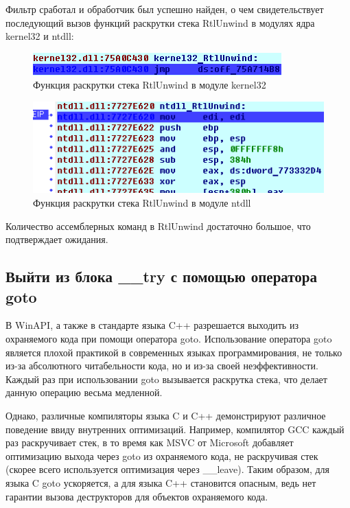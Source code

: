 \documentclass[14pt,a4paper,report]{report}
\begin{document}
Фильтр сработал и обработчик был успешно найден, о чем свидетельствует последующий вызов функций раскрутки стека RtlUnwind в модулях ядра kernel32 и ntdll:

\begin{figure}[h!]
	\centering
	\includegraphics[scale = 0.75]{images/6_d6.png}
	\caption{Функция раскрутки стека RtlUnwind в модуле kernel32}
\end{figure}

\begin{figure}[h!]
	\centering
	\includegraphics[scale = 0.75]{images/6_d7.png}
	\caption{Функция раскрутки стека RtlUnwind в модуле ntdll}
\end{figure}

Количество ассемблерных команд в RtlUnwind достаточно большое, что подтверждает ожидания. 

\subsection{Выйти из блока \_\_try с помощью оператора goto}

В WinAPI, а также в стандарте языка C++ разрешается выходить из охраняемого кода при помощи оператора goto. Использование оператора goto является плохой практикой в современных языках программирования, не только из-за абсолютного читабельности кода, но и из-за своей неэффективности. Каждый раз при использовании goto вызывается раскрутка стека, что делает данную операцию весьма медленной.

Однако, различные компиляторы языка C и C++ демонстрируют различное поведение ввиду внутренних оптимизаций. Например, компилятор GCC каждый раз раскручивает стек, в то время как MSVC от Microsoft добавляет оптимизацию выхода через goto из охраняемого кода, не раскручивая стек (скорее всего используется оптимизация через \_\_leave). Таким образом, для языка C goto ускоряется, а для языка C++ становится опасным, ведь нет гарантии вызова деструкторов для объектов охраняемого кода.
\end{document}
